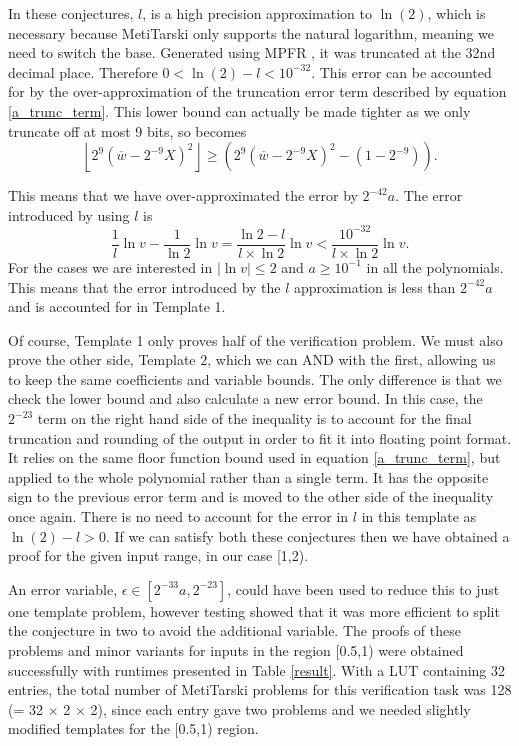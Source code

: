 \documentclass{fac}
\newcommand{\abs}[1]{\lvert#1\rvert}
\begin{document}
In these conjectures, $l$, is a high precision approximation to $\ln(2)$, which is necessary because MetiTarski only supports the natural logarithm, meaning we need to switch the base. Generated using MPFR \cite{fousse2007mpfr}, it was truncated at the 32nd decimal place. Therefore $0<\ln{(2)}-l<10^{-32}$. This error can be accounted for by the over-approximation of the truncation error term described by equation \ref{a_trunc_term}. This lower bound can actually be made tighter as we only truncate off at most 9 bits, so becomes
\begin{equation*} 
    \left \lfloor2^9(\overline{w}-2^{-9}X)^2\right \rfloor  
    \geq 
    (2^9(\overline{w}-2^{-9}X)^2-(1-2^{-9})).
\end{equation*}

This means that we have over-approximated the error by $2^{-42}a$. The error introduced by using $l$ is
\begin{equation*}
    \frac{1}{l}\ln{v} - \frac{1}{\ln{2}}\ln{v} = 
    \frac{\ln{2}-l}{l\times \ln{2}}\ln{v} < \frac{10^{-32}}{l \times \ln{2}} \ln{v}. 
\end{equation*}
For the cases we are interested in $\abs{\ln{v}}\leq 2$ and $a\geq 10^{-1}$ in all the polynomials. This means that the error introduced by the $l$ approximation is less than $2^{-42}a$ and is accounted for in Template 1. 

Of course, Template 1 only proves half of the verification problem. We must also prove the other side, Template $2$, which we can AND with the first, allowing us to keep the same coefficients and variable bounds. The only difference is that we check the lower bound and also calculate a new error bound. In this case, the $2^{-23}$ term on the right hand side of the inequality is to account for the final truncation and rounding of the output in order to fit it into floating point format. It relies on the same floor function bound used in equation \ref{a_trunc_term}, but applied to the whole polynomial rather than a single term. It has the opposite sign to the previous error term and is moved to the other side of the inequality once again. There is no need to account for the error in $l$ in this template as $\ln{(2)}-l>0$. If we can satisfy both these conjectures then we have obtained a proof for the given input range, in our case [1,2). 

An error variable, $\epsilon \in [2^{-33}a, 2^{-23}]$, could have been used to reduce this to just one template problem, however testing showed that it was more efficient to split the conjecture in two to avoid the additional variable. The proofs of these problems and minor variants for inputs in the region [0.5,1) were obtained successfully with runtimes presented in Table \ref{result}. With a LUT containing 32 entries, the total number of MetiTarski problems for this verification task was 128 (= 32 $\times$ 2 $\times$ 2), since each entry gave two problems and we needed slightly modified templates for the [0.5,1) region. 
\end{document}
